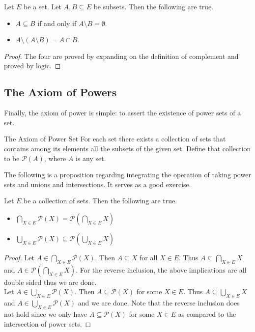 \documentclass[a4paper]{article}
\begin{document}
\begin{lmm}{}{} Let $E$ be a set. Let $A,B\subseteq E$ be subsets. Then the following are true. 
\begin{itemize}
\item $A\subseteq B$ if and only if $A\setminus B=\emptyset$. 
\item $A\setminus(A\setminus B)=A\cap B$. 
\end{itemize}
\begin{proof} The four are proved by expanding on the definition of complement and proved by logic. 
\end{proof}
\end{lmm}

\subsection{The Axiom of Powers}
Finally, the axiom of power is simple: to assert the existence of power sets of a set. 

\begin{axm}{The Axiom of Power Set}{} For each set there exists a collection of sets that contains among its elements all the subsets of the given set. Define that collection to be $\mathcal{P}(A)$, where $A$ is any set. 
\end{axm}

The following is a proposition regarding integrating the operation of taking power sets and unions and intersections. It serves as a good exercise. 

\begin{prp}{}{} Let $E$ be a collection of sets. Then the following are true. 
\begin{itemize}
\item $\bigcap_{X\in E}\mathcal{P}(X)=\mathcal{P}(\bigcap_{X\in E}X)$
\item $\bigcup_{X\in E}\mathcal{P}(X)\subseteq\mathcal{P}(\bigcup_{X\in E}X)$
\end{itemize}
\begin{proof}
Let $A\in\bigcap_{X\in E}\mathcal{P}(X)$. Then $A\subseteq X$ for all $X\in E$. Thus $A\subseteq\bigcap_{X\in E}X$ and $A\in\mathcal{P}(\bigcap_{X\in E}X)$. For the reverse inclusion, the above implications are all double sided thus we are done. \\
Let $A\in\bigcup_{X\in E}\mathcal{P}(X)$. Then $A\subseteq\mathcal{P}(X)$ for some $X\in E$. Thus $A\subseteq\bigcup_{X\in E}X$ and $A\in\bigcup_{X\in E}\mathcal{P}(X)$ and we are done. Note that the reverse inclusion does not hold since we only have $A\subseteq\mathcal{P}(X)$ for some $X\in E$ as compared to the intersection of power sets. 
\end{proof}
\end{prp}
\end{document}

